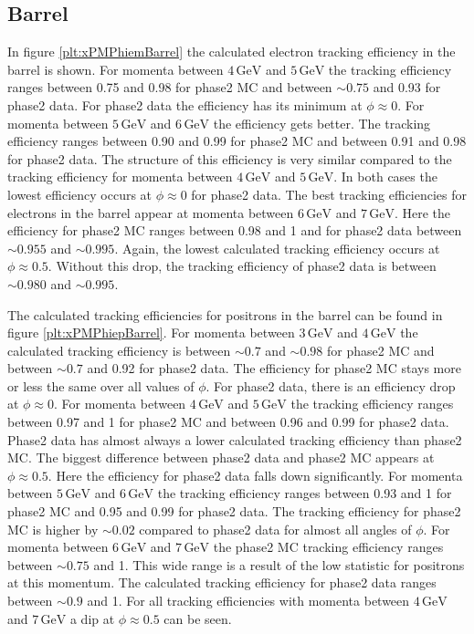 \documentclass[a4paper,11pt,twosided,final,german,openbib,pdftex,listof=totoc,bibliography=totoc]{scrbook}
\begin{document}
\newpage

\subsection{Barrel}

In figure \ref{plt:xPMPhiemBarrel} the calculated electron tracking efficiency in the barrel is shown. For momenta between $4\,\textrm{GeV}$ and $5\,\textrm{GeV}$ the tracking efficiency ranges between 0.75 and 0.98 for phase2 MC and between $\sim 0.75$ and 0.93 for phase2 data. For phase2 data the efficiency has its minimum at $\phi \approx 0$. For momenta between $5\,\textrm{GeV}$ and $6\,\textrm{GeV}$ the efficiency gets better. The tracking efficiency ranges between 0.90 and 0.99 for phase2 MC and between 0.91 and 0.98 for phase2 data. The structure of this efficiency is very similar compared to the tracking efficiency for momenta between $4\,\textrm{GeV}$ and $5\,\textrm{GeV}$. In both cases the lowest efficiency occurs at $\phi \approx 0$ for phase2 data. The best tracking efficiencies for electrons in the barrel appear at momenta between $6\,\textrm{GeV}$ and $7\,\textrm{GeV}$. Here the efficiency for phase2 MC ranges between 0.98 and 1 and for phase2 data between $\sim 0.955$ and $\sim 0.995$. Again, the lowest calculated tracking efficiency occurs at  $\phi \approx 0.5$. Without this drop, the tracking efficiency of phase2 data is between $\sim 0.980$ and $\sim 0.995$. 

The calculated tracking efficiencies for positrons in the barrel can be found in figure \ref{plt:xPMPhiepBarrel}. 
For momenta between $3\,\textrm{GeV}$ and $4\,\textrm{GeV}$ the calculated tracking efficiency is between $\sim 0.7$ and $\sim 0.98$ for phase2 MC and between $\sim 0.7$ and 0.92 for phase2 data. The efficiency for phase2 MC stays more or less the same over all values of $\phi$. For phase2 data, there is an efficiency drop at $\phi \approx 0$.
For momenta between $4\,\textrm{GeV}$ and $5\,\textrm{GeV}$ the tracking efficiency ranges between 0.97 and 1 for phase2 MC and between 0.96 and 0.99 for phase2 data. Phase2 data has almost always a lower calculated tracking efficiency than phase2 MC.
The biggest difference between phase2 data and phase2 MC appears at $\phi \approx 0.5$. Here the efficiency for phase2 data falls down significantly. 
For momenta between $5\,\textrm{GeV}$ and $6\,\textrm{GeV}$ the tracking efficiency ranges between 0.93 and 1 for phase2 MC and 0.95  and 0.99 for phase2 data. The tracking efficiency for phase2 MC is higher by $\sim 0.02$ compared to phase2 data for almost all  angles of $\phi$. 
For momenta between $6\,\textrm{GeV}$ and $7\,\textrm{GeV}$ the phase2 MC tracking efficiency ranges between $\sim 0.75$ and 1. This wide range is a result of the low statistic for positrons at this momentum. The calculated tracking efficiency for phase2 data ranges between $\sim 0.9$ and 1. For all tracking efficiencies with momenta between $4\,\textrm{GeV}$ and $7\,\textrm{GeV}$ a dip at $\phi \approx 0.5$ can be seen.
\end{document}
